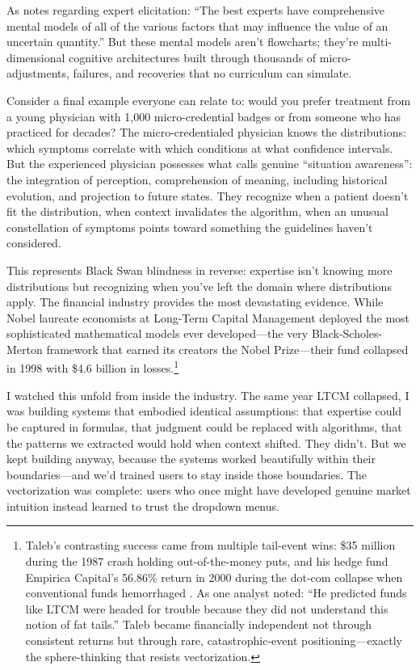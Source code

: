 As \citet{morgan2014} notes regarding expert elicitation: ``The best experts have comprehensive mental models of all of the various factors that may influence the value of an uncertain quantity.'' But these mental models aren't flowcharts; they're multi-dimensional cognitive architectures built through thousands of micro-adjustments, failures, and recoveries that no curriculum can simulate.

Consider a final example everyone can relate to: would you prefer treatment from a young physician with 1,000 micro-credential badges or from someone who has practiced for decades? The micro-credentialed physician knows the distributions: which symptoms correlate with which conditions at what confidence intervals. But the experienced physician possesses what \citet{endsley1995} calls genuine ``situation awareness'': the integration of perception, comprehension of meaning, including historical evolution, and projection to future states. They recognize when a patient doesn't fit the distribution, when context invalidates the algorithm, when an unusual constellation of symptoms points toward something the guidelines haven't considered.

This represents \citet{taleb2007} Black Swan blindness in reverse: expertise isn't knowing more distributions but recognizing when you've left the domain where distributions apply. The financial industry provides the most devastating evidence. While Nobel laureate economists at Long-Term Capital Management deployed the most sophisticated mathematical models ever developed---the very Black-Scholes-Merton framework that earned its creators the Nobel Prize---their fund collapsed in 1998 with \$4.6 billion in losses.\footnote{Taleb's contrasting success came from multiple tail-event wins: \$35 million during the 1987 crash holding out-of-the-money puts, and his hedge fund Empirica Capital's 56.86\% return in 2000 during the dot-com collapse when conventional funds hemorrhaged \citep{taleb2001,lowenstein2000}. As one analyst noted: ``He predicted funds like LTCM were headed for trouble because they did not understand this notion of fat tails.'' Taleb became financially independent not through consistent returns but through rare, catastrophic-event positioning---exactly the sphere-thinking that resists vectorization.}

I watched this unfold from inside the industry. The same year LTCM collapsed, I was building systems that embodied identical assumptions: that expertise could be captured in formulas, that judgment could be replaced with algorithms, that the patterns we extracted would hold when context shifted. They didn't. But we kept building anyway, because the systems worked beautifully within their boundaries---and we'd trained users to stay inside those boundaries. The vectorization was complete: users who once might have developed genuine market intuition instead learned to trust the dropdown menus.

